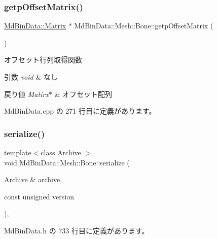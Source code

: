 \subsubsection{\texorpdfstring{getp\+Offset\+Matrix()}{getpOffsetMatrix()}}
{\footnotesize\ttfamily \mbox{\hyperlink{class_md_bin_data_1_1_matrix}{Md\+Bin\+Data\+::\+Matrix}} $\ast$ Md\+Bin\+Data\+::\+Mesh\+::\+Bone\+::getp\+Offset\+Matrix (\begin{DoxyParamCaption}{ }\end{DoxyParamCaption})}



オフセット行列取得関数 


\begin{DoxyParams}{引数}
{\em void} & なし \\
\hline
\end{DoxyParams}

\begin{DoxyRetVals}{戻り値}
{\em Matirx$\ast$} & オフセット配列 \\
\hline
\end{DoxyRetVals}


 Md\+Bin\+Data.\+cpp の 271 行目に定義があります。

\mbox{\label{class_md_bin_data_1_1_mesh_1_1_bone_aa28ecffb26fc5ae631664ae97c099a25}} 
\subsubsection{\texorpdfstring{serialize()}{serialize()}}
{\footnotesize\ttfamily template$<$class Archive $>$ \\
void Md\+Bin\+Data\+::\+Mesh\+::\+Bone\+::serialize (\begin{DoxyParamCaption}\item[{Archive \&}]{archive,  }\item[{const unsigned}]{version }\end{DoxyParamCaption})\hspace{0.3cm}{\ttfamily [inline]}, {\ttfamily [private]}}



 Md\+Bin\+Data.\+h の 733 行目に定義があります。

\mbox{\label{class_md_bin_data_1_1_mesh_1_1_bone_af7edfd3047be8f110d4ab995738c6af3}} 
